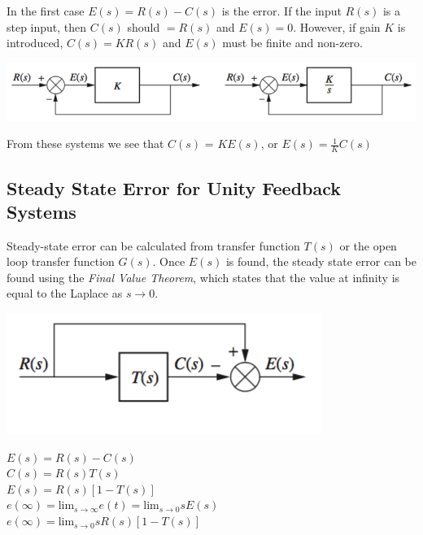\documentclass[11pt]{article}
\begin{document}
    In the first case $E(s) = R(s) - C(s)$ is the error. If the input $R(s)$ is a step input, then $C(s)$ should $= R(s)$ and $E(s) = 0$. However, if gain $K$ is introduced, $C(s) = KR(s)$ and $E(s)$ must be finite and non-zero. \\
    
    \begin{center}
        \includegraphics[width=300 px]{img/integrator} \\
    \end{center}

    From these systems we see that $C(s)$ = $KE(s)$, or $E(s) = \frac{1}{K}C(s)$

    \subsection{Steady State Error for Unity Feedback Systems}

    Steady-state error can be calculated from transfer function $T(s)$ or the open loop transfer function $G(s)$. Once $E(s)$ is found, the steady state error can be found using the \textit{Final Value Theorem}, which states that the value at infinity is equal to the Laplace as $s \rightarrow 0$.

    \begin{center}
        \includegraphics[width=300 px]{img/closedlooperror} \\
    \end{center}

    \begin{center}
        $E(s) = R(s) - C(s)$ \\
        $C(s) = R(s)T(s)$ \\ 
        $E(s) = R(s)[1 - T(s)]$ \\
        $e(\infty) = \text{lim}_{s\rightarrow \infty}  e(t) = \text{lim}_{s\rightarrow 0}  sE(s)$ \\ 
        $e(\infty) = \text{lim}_{s\rightarrow 0} sR(s)[1 - T(s)]$ \\
    \end{center}
\end{document}
